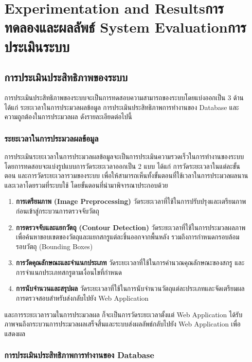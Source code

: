 \chapter{\ifproject%
      \ifenglish Experimentation and Results\else การทดลองและผลลัพธ์\fi
  \else%
      \ifenglish System Evaluation\else การประเมินระบบ\fi
  \fi}

\section{การประเมินประสิทธิภาพของระบบ}

การประเมินประสิทธิภาพของระบบจะเป็นการทดสอบความสามารถของระบบโดยแบ่งออกเป็น 3 ด้าน ได้แก่ ระยะเวลาในการประมวลผลข้อมูล การประเมินประสิทธิภาพการทำงานของ Database และความถูกต้องในการประมวลผล ดังรายละเอียดต่อไปนี้

\subsection{ระยะเวลาในการประมวลผลข้อมูล}

การประเมินระยะเวลาในการประมวลผลข้อมูลจะเป็นการประเมินความรวดเร็วในการทำงานของระบบโดยการทดสอบจะแบ่งรูปแบบการวัดระยะเวลาออกเป็น 2 แบบ ได้แก่ การวัดระยะเวลาในแต่ละขั้นตอน และการวัดระยะเวลารวมของระบบ เพื่อให้สามารถเห็นทั้งขั้นตอนที่ใช้เวลาในการประมวลผลนานและเวลาโดยรวมที่ระบบใช้ โดยขั้นตอนที่นำมาพิจารณาประกอบด้วย

\begin{enumerate}        
    \item \textbf{การเตรียมภาพ (Image Preprocessing)} วัดระยะเวลาที่ใช้ในการปรับปรุงและเตรียมภาพก่อนเข้าสู่กระบวนการตรวจจับวัตถุ
    \item \textbf{การตรวจจับและแยกวัตถุ (Contour Detection)} วัดระยะเวลาที่ใช้ในการประมวลผลภาพเพื่อค้นหาขอบเขตของวัตถุและแยกสกรูแต่ละชิ้นออกจากพื้นหลัง รวมถึงการกำหนดกรอบล้อมรอบวัตถุ (Bounding Boxes)
    \item \textbf{การวัดคุณลักษณะและจำแนกประเภท} วัดระยะเวลาที่ใช้ในการคำนวณคุณลักษณะของสกรู และการจำแนกประเภทสกรูตามเงื่อนไขที่กำหนด
    \item \textbf{การนับจำนวนและสรุปผล} วัดระยะเวลาที่ใช้ในการนับจำนวนวัตถุแต่ละประเภทและจัดเตรียมผลการตรวจสอบสำหรับส่งกลับไปยัง Web Application
\end{enumerate}

และการระยะเวลารวมในการประมวลผล ก็จะเป็นการวัดระยะเวลาตั้งแต่ Web Application ได้รับภาพจนถึงกระบวนการประมวลผลเสร็จสิ้นและระบบส่งผลลัพธ์กลับไปยัง Web Application เพื่อแสดงผล

\subsection{การประเมินประสิทธิภาพการทำงานของ Database}

